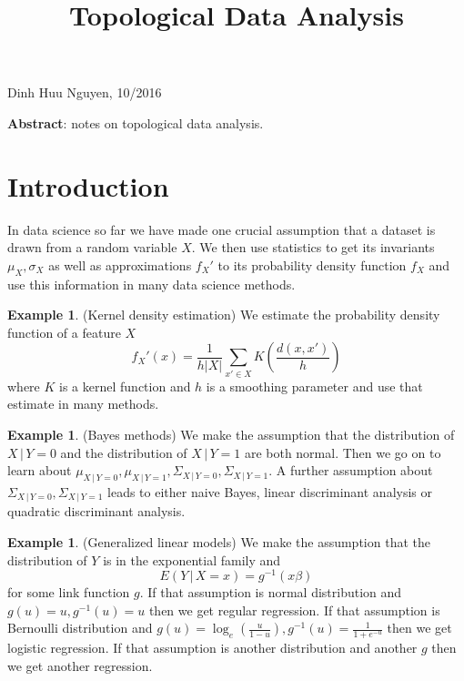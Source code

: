 \documentclass[12pt]{amsart}
\title{Topological Data Analysis}
\theoremstyle{definition}
\newtheorem{example}[theorem]{Example}
\begin{document}
\maketitle

\begin{center} Dinh Huu Nguyen, 10/2016 \end{center}
\vspace{20pt}

\textbf{Abstract}: notes on topological data analysis.
\vspace{20pt}

\tableofcontents

\section{Introduction} In data science so far we have made one crucial assumption that a dataset is drawn from a random variable $X$. We then use statistics to get its invariants $\mu_X, \sigma_X$ as well as approximations $f_X'$ to its probability density function $f_X$ and use this information in many data science methods.

\begin{example} (Kernel density estimation) We estimate the probability density function of a feature $X$
$$f_X'(x) = \frac{1}{h |X|} \sum\limits_{x' \in X} K \left( \frac{d(x, x')}{h} \right)$$
where $K$ is a kernel function and $h$ is a smoothing parameter and use that estimate in many methods.
\end{example}

\begin{example} (Bayes methods) We make the assumption that the distribution of $X \,|\, Y = 0$ and the distribution of $X \,|\, Y = 1$ are both normal. Then we go on to learn about $\mu_{X \,|\, Y = 0}, \mu_{X \,|\, Y = 1}, \Sigma_{X \,|\, Y = 0}, \Sigma_{X \,|\, Y = 1}$. A further assumption about $\Sigma_{X \,|\, Y = 0}, \Sigma_{X \,|\, Y = 1}$ leads to either naive Bayes, linear discriminant analysis or quadratic discriminant analysis.
\end{example}

\begin{example}\label{generalizedlinearmodels} (Generalized linear models) We make the assumption that the distribution of $Y$ is in the exponential family and
$$E(Y \,|\, X = x) = g^{-1}(x \beta)$$
for some link function $g$. If that assumption is normal distribution and $g(u) = u, g^{-1}(u) = u$ then we get regular regression. If that assumption is Bernoulli distribution and $g(u) = \log_e \left( \frac{u}{1 - u} \right), g^{-1}(u) = \frac{1}{1 + e^{-u}}$ then we get logistic regression. If that assumption is another distribution and another $g$ then we get another regression.
\end{example}
\end{document}
